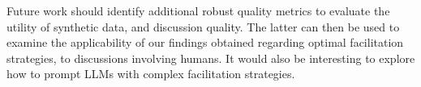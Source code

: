 %

Future work should identify additional robust quality metrics to evaluate the utility of synthetic data, and discussion quality. The latter can then be used to examine the applicability of our findings obtained regarding optimal facilitation strategies, to discussions involving humans. It would also be interesting to explore how to prompt LLMs with complex facilitation strategies.